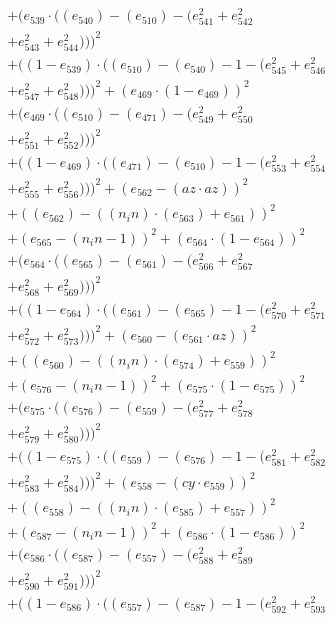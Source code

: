 \documentclass[10pt, a4paper]{article}
\begin{document}
\begin{align*}
& + (e_{539}  \cdot  ((e_{540}) - (e_{510}) - (e_{541}^{2} + e_{542}^{2} \\
& + e_{543}^{2} + e_{544}^{2})))^{2} \\
& + ((1 - e_{539})  \cdot  ((e_{510}) - (e_{540}) - 1 - (e_{545}^{2} + e_{546}^{2} \\
& + e_{547}^{2} + e_{548}^{2})))^{2} + (e_{469}  \cdot  (1 - e_{469}))^{2} \\
& + (e_{469}  \cdot  ((e_{510}) - (e_{471}) - (e_{549}^{2} + e_{550}^{2} \\
& + e_{551}^{2} + e_{552}^{2})))^{2} \\
& + ((1 - e_{469})  \cdot  ((e_{471}) - (e_{510}) - 1 - (e_{553}^{2} + e_{554}^{2} \\
& + e_{555}^{2} + e_{556}^{2})))^{2} + (e_{562} - (az  \cdot  az))^{2} \\
& + ((e_{562}) - ((n_in)  \cdot  (e_{563}) + e_{561}))^{2} \\
& + (e_{565} - (n_in - 1))^{2} + (e_{564}  \cdot  (1 - e_{564}))^{2} \\
& + (e_{564}  \cdot  ((e_{565}) - (e_{561}) - (e_{566}^{2} + e_{567}^{2} \\
& + e_{568}^{2} + e_{569}^{2})))^{2} \\
& + ((1 - e_{564})  \cdot  ((e_{561}) - (e_{565}) - 1 - (e_{570}^{2} + e_{571}^{2} \\
& + e_{572}^{2} + e_{573}^{2})))^{2} + (e_{560} - (e_{561}  \cdot  az))^{2} \\
& + ((e_{560}) - ((n_in)  \cdot  (e_{574}) + e_{559}))^{2} \\
& + (e_{576} - (n_in - 1))^{2} + (e_{575}  \cdot  (1 - e_{575}))^{2} \\
& + (e_{575}  \cdot  ((e_{576}) - (e_{559}) - (e_{577}^{2} + e_{578}^{2} \\
& + e_{579}^{2} + e_{580}^{2})))^{2} \\
& + ((1 - e_{575})  \cdot  ((e_{559}) - (e_{576}) - 1 - (e_{581}^{2} + e_{582}^{2} \\
& + e_{583}^{2} + e_{584}^{2})))^{2} + (e_{558} - (cy  \cdot  e_{559}))^{2} \\
& + ((e_{558}) - ((n_in)  \cdot  (e_{585}) + e_{557}))^{2} \\
& + (e_{587} - (n_in - 1))^{2} + (e_{586}  \cdot  (1 - e_{586}))^{2} \\
& + (e_{586}  \cdot  ((e_{587}) - (e_{557}) - (e_{588}^{2} + e_{589}^{2} \\
& + e_{590}^{2} + e_{591}^{2})))^{2} \\
& + ((1 - e_{586})  \cdot  ((e_{557}) - (e_{587}) - 1 - (e_{592}^{2} + e_{593}^{2} \\

\end{align*}
\end{document}
